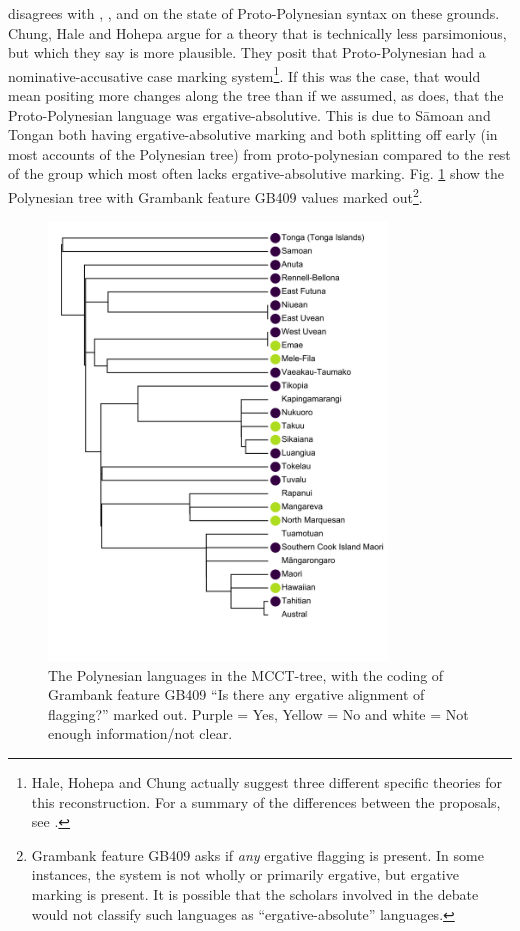 \documentclass[a4paper,10pt]{article} %
\begin{document}
\citet{clark1976aspects} disagrees with \citet{hale_1968}, \citet{hohepa_1969}, and \citet{chung1978} on the state of Proto-Polynesian syntax on these grounds. Chung, Hale and Hohepa argue for a theory that is technically less parsimonious, but which they say is more plausible. They posit that Proto-Polynesian had a nominative-accusative case marking system\footnote{Hale, Hohepa and Chung actually suggest three different specific theories for this reconstruction. For a summary of the differences between the proposals, see \citet[247-249]{chung1978}.}. If this was the case, that would mean positing more changes along the tree than if we assumed, as \citet{clark1976aspects} does, that the Proto-Polynesian language was ergative-absolutive. This is due to S\={a}moan and Tongan both having ergative-absolutive marking and both splitting off early (in most accounts of the Polynesian tree) from proto-polynesian compared to the rest of the group which most often lacks ergative-absolutive marking. Fig. \ref{poly_GB409_tree} show the Polynesian tree with Grambank feature GB409 values marked out\footnote{Grambank feature GB409 asks if \emph{any} ergative flagging is present. In some instances, the system is not wholly or primarily ergative, but ergative marking is present. It is possible that the scholars involved in the debate would not classify such languages as ``ergative-absolute'' languages.}.

\begin{figure}[H]
\centering
\includegraphics[width=9cm]{illustrations/plots_from_R//tree_plots/poly_tree_example.png}
\caption{{The Polynesian languages in the \citet{grayetal_2009} MCCT-tree, with the coding of Grambank feature GB409 ``Is there any ergative alignment of flagging?'' marked out. Purple = Yes, Yellow = No and white = Not enough information/not clear.}}
\label{poly_GB409_tree}
\end{figure} 
\end{document}
